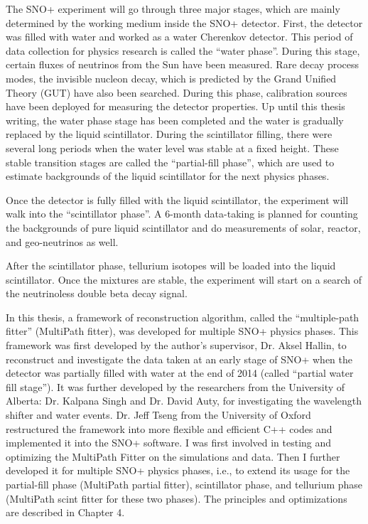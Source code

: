 The SNO+ experiment will go through three major stages, which are mainly determined by the working medium inside the SNO+ detector. First, the detector was filled with water and worked as a water Cherenkov detector. This period of data collection for physics research is called the ``water phase''. During this stage, certain fluxes of neutrinos from the Sun have been measured. Rare decay process modes, the invisible nucleon decay, which is predicted by the Grand Unified Theory (GUT) have also been searched. During this phase, calibration sources have been deployed for measuring the detector properties. Up until this thesis writing, the water phase stage has been completed and the water is gradually replaced by the liquid scintillator. During the scintillator filling, there were several long periods when the water level was stable at a fixed height. These stable transition stages are called the ``partial-fill phase'', which are used to estimate backgrounds of the liquid scintillator for the next physics phases.

Once the detector is fully filled with the liquid scintillator, the experiment will walk into the ``scintillator phase''. A 6-month data-taking is planned for counting the backgrounds of pure liquid scintillator and do measurements of solar, reactor, and geo-neutrinos as well.%

After the scintillator phase, tellurium isotopes will be loaded into the liquid scintillator. Once the mixtures are stable, the experiment will start on a search of the neutrinoless double beta decay signal.

In this thesis, a framework of reconstruction algorithm, called the ``multiple-path fitter'' (MultiPath fitter), was developed for multiple SNO+ physics phases. This framework was first developed by the author's supervisor, Dr. Aksel Hallin, to reconstruct and investigate the data taken at an early stage of SNO+ when the detector was partially filled with water at the end of 2014 (called ``partial water fill stage'')\cite{partialWater}. It was further developed by the researchers from the University of Alberta: Dr. Kalpana Singh and Dr. David Auty, for investigating the wavelength shifter and water events\cite{davidPartialWater, kalpanaWLS, kalpanaWLS2, kalpanaMPFitter}. Dr. Jeff Tseng from the University of Oxford restructured the framework into more flexible and efficient C++ codes and implemented it into the SNO+ software\cite{jieMPW}. I was first involved in testing and optimizing the MultiPath Fitter on the simulations and data. Then I further developed it for multiple SNO+ physics phases, i.e., to extend its usage for the partial-fill phase (MultiPath partial fitter), scintillator phase, and tellurium phase (MultiPath scint fitter for these two phases). The principles and optimizations are described in Chapter 4.

